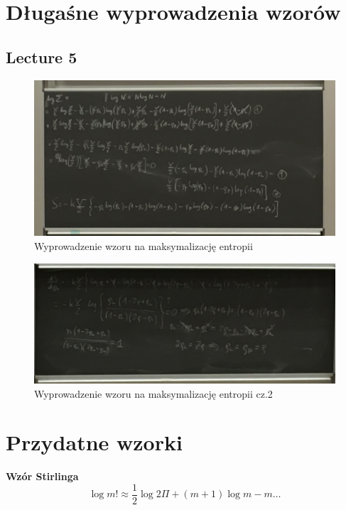 \documentclass[12pt,a4paper]{report}
\renewcommand{\emph}{\textbf}
\begin{document}
\chapter{Długaśne wyprowadzenia wzorów}

\section{Lecture 5}

\begin{figure}[!ht]
    \centering
    \includegraphics[width=\linewidth]{Wyk_5_Rys_2.JPG}
    \caption{Wyprowadzenie wzoru na maksymalizację entropii}
    \label{fig:lec_5:app:maksymalizacja_entropii}
\end{figure}


\begin{figure}[!ht]
    \centering
    \includegraphics[width=\linewidth]{Wyk_5_Rys_3.JPG}
    \caption{Wyprowadzenie wzoru na maksymalizację entropii cz.2}
    \label{fig:lec_5:app:maksymalizacja_entropii_2}
\end{figure}

\chapter{Przydatne wzorki}

\emph{Wzór Stirlinga}
\begin{equation}
    \log m! \approx \frac12 \log 2 \Pi + (m+1) \log m - m \dots
    \label{eq:app_wzory:stirling}
\end{equation}
\end{document}
